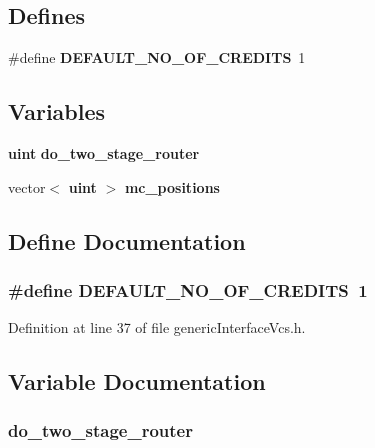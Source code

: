 \subsection*{Defines}
\begin{CompactItemize}
\item 
\#define {\bf DEFAULT\_\-NO\_\-OF\_\-CREDITS}~1
\end{CompactItemize}
\subsection*{Variables}
\begin{CompactItemize}
\item 
{\bf uint} {\bf do\_\-two\_\-stage\_\-router}
\item 
vector$<$ {\bf uint} $>$ {\bf mc\_\-positions}
\end{CompactItemize}


\subsection{Define Documentation}
\subsubsection[{DEFAULT\_\-NO\_\-OF\_\-CREDITS}]{\setlength{\rightskip}{0pt plus 5cm}\#define DEFAULT\_\-NO\_\-OF\_\-CREDITS~1}\label{genericInterfaceVcs_8h_944a5420832d6aa2a88d533b80b6c016}




Definition at line 37 of file genericInterfaceVcs.h.

\subsection{Variable Documentation}
\subsubsection[{do\_\-two\_\-stage\_\-router}]{ {\bf do\_\-two\_\-stage\_\-router}}\label{genericInterfaceVcs_8h_5ef61643d57baddad3f036737403d4cf}




